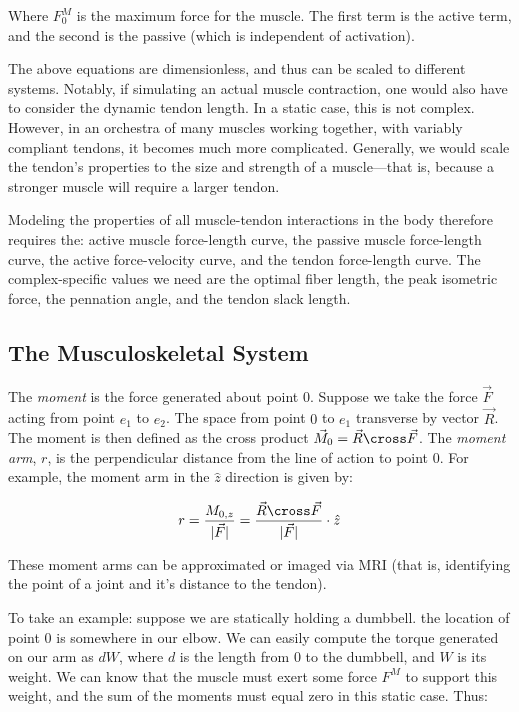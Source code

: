 Where $F_0^M$ is the maximum force for the muscle. The first term is the active term, and the second is the passive (which is independent of activation).\newline

The above equations are dimensionless, and thus can be scaled to different systems. Notably, if simulating an actual muscle contraction, one would also have to consider the dynamic tendon length. In a static case, this is not complex. However, in an orchestra of many muscles working together, with variably compliant tendons, it becomes much more complicated. Generally, we would scale the tendon's properties to the size and strength of a muscle---that is, because a stronger muscle will require a larger tendon. \newline

Modeling the properties of all muscle-tendon interactions in the body therefore requires the: active muscle force-length curve, the passive muscle force-length curve, the active force-velocity curve, and the tendon force-length curve. The complex-specific values we need are the optimal fiber length, the peak isometric force, the pennation angle, and the tendon slack length. 


\subsection{The Musculoskeletal System}

The \textit{moment} is the force generated about point $0$. Suppose we take the force $\Vec{F}$ acting from point $e_1$ to $e_2$. The space from point $0$ to $e_1$ transverse by vector $\Vec{R}$. The moment is then defined as the cross product $\Vec{M}_0 = \Vec{R} \cross \Vec{F}$. The \textit{moment arm}, $r$, is the perpendicular distance from the line of action to point 0. For example, the moment arm in the $\hat{z}$ direction is given by: 

\begin{equation}
\begin{split}
    r = \frac{M_{0,z}}{|\Vec{F}|} = \frac{\Vec{R} \cross \Vec{F}}{|\Vec{F}|} \cdot \hat{z}
\end{split}
\end{equation}

These moment arms can be approximated or imaged via MRI (that is, identifying the point of a joint and it's distance to the tendon).\newline

To take an example: suppose we are statically holding a dumbbell. the location of point $0$ is somewhere in our elbow. We can easily compute the torque generated on our arm as $dW$, where $d$ is the length from $0$ to the dumbbell, and $W$ is its weight. We can know that the muscle must exert some force $F^M$ to support this weight, and the sum of the moments must equal zero in this static case. Thus: 

